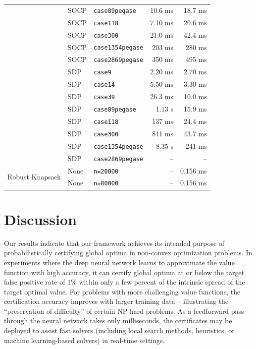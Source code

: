 \documentclass[10pt]{article} %
\theoremstyle{plain}
\theoremstyle{definition}
\theoremstyle{remark}
\begin{document}
\begin{table}[t]
\begin{tabular}{lll rr}
   & SOCP & \texttt{case89pegase} & 10.6 ms & 18.7 ms \\
   & SOCP & \texttt{case118} & 7.10 ms & 20.6 ms \\
   & SOCP & \texttt{case300} & 21.0 ms & 42.4 ms \\
   & SOCP & \texttt{case1354pegase} & 203 ms & 280 ms \\
   & SOCP & \texttt{case2869pegase} & 350 ms & 495 ms \\
   & SDP & \texttt{case9} & 2.20 ms & 2.70 ms \\
   & SDP & \texttt{case14} & 5.50 ms & 3.30 ms \\
   & SDP & \texttt{case39} & 26.3 ms & 10.0 ms \\
   & SDP & \texttt{case89pegase} & 1.13 s & 15.9 ms \\
   & SDP & \texttt{case118} & 137 ms & 24.4 ms \\
   & SDP & \texttt{case300} & 811 ms & 43.7 ms \\
   & SDP & \texttt{case1354pegase} & 8.35 s & 241 ms \\
   & SDP & \texttt{case2869pegase} & -- & -- \\
\midrule
  \multirow{2}{*}{Robust Knapsack} & None & \texttt{n=20000} & -- & 0.156 ms \\
   & None & \texttt{n=80000} & -- & 0.156 ms \\
\bottomrule
\end{tabular}
\end{table}


\section{Discussion} \label{sec:discussion}

Our results indicate that our framework achieves its intended purpose of probabilistically certifying global optima in non-convex optimization problems.
In experiments where the deep neural network learns to approximate the value function with high accuracy, it can certify global optima at or below the target 
false positive rate of $1\%$ within only a few percent of the intrinsic spread of the target optimal value.
For problems with more challenging value functions, the certification accuracy improves with larger training data -- illustrating the
``preservation of difficulty'' of certain NP-hard problems.
As a feedforward pass through the neural network takes only milliseconds, the certificates may be deployed to assist fast solvers
(including local search methods, heuristics, or machine learning-based solvers) in real-time settings.
\end{document}
